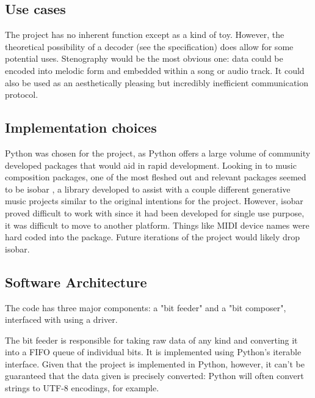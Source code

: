 \documentclass[runningheads,a4paper]{llncs}
\begin{document}
\subsection{Use cases} %

The project has no inherent function except as a kind of toy. However, the
theoretical possibility of a decoder (see the specification) does allow for some
potential uses. Stenography would be the most obvious one: data could be encoded
into melodic form and embedded within a song or audio track. It could also be
used as an aesthetically pleasing but incredibly inefficient communication
protocol.

\subsection{Implementation choices}

Python was chosen for the project, as Python offers a large volume of community
developed packages that would aid in rapid development. Looking in to music
composition packages, one of the most fleshed out and relevant packages seemed
to be isobar \cite{isobar}, a library developed to assist with a couple
different generative music projects similar to the original intentions for the
project. However, isobar proved difficult to work with since it had been
developed for single use purpose, it was difficult to move to another platform.
Things like MIDI device names were hard coded into the package. Future iterations
of the project would likely drop isobar.


\subsection{Software Architecture} %


The code has three major components: a "bit feeder" and a "bit composer",
interfaced with using a driver.

The bit feeder is responsible for taking raw data of any kind and converting it
into a FIFO queue of individual bits. It is implemented using Python's iterable
interface. Given that the project is implemented in Python, however, it can't be
guaranteed that the data given is precisely converted: Python will often convert
strings to UTF-8 encodings, for example.
\end{document}
